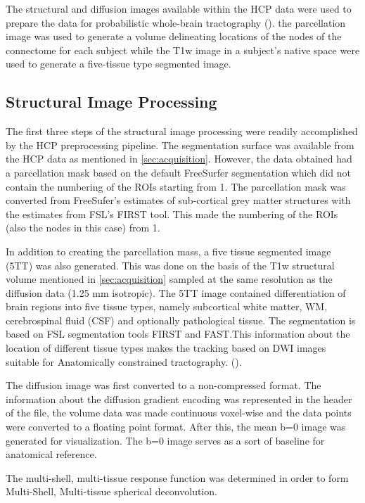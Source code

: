 \documentclass[msthesis.tex]{subfiles}
\begin{document}
The structural and diffusion images available within the HCP data were used to prepare the data for probabilistic whole-brain tractography (\cite{parker2003framework}). the parcellation image was used to generate a volume delineating locations of the nodes of the connectome for each subject while the T1w image in a subject's native space were used to generate a five-tissue type segmented image.

\subsection{Structural Image Processing}
\label{subsec:struct_diff}

The first three steps of the structural image processing were readily accomplished by the HCP preprocessing pipeline. The segmentation surface was available from the HCP data as mentioned in  \autoref{sec:acquisition}. However, the data obtained had a parcellation mask based on the default FreeSurfer segmentation which did not contain the numbering of the ROIs starting from 1. The parcellation mask was converted from FreeSufer's estimates of sub-cortical grey matter structures with the estimates from FSL's FIRST tool. This made the numbering of the ROIs (also the nodes in this case) from 1. 

In addition to creating the parcellation mass, a five tissue segmented image (5TT) was also generated. This was done on the basis of the T1w structural volume mentioned in \autoref{sec:acquisition} sampled at the same resolution as the diffusion data (1.25 mm isotropic). The 5TT image contained differentiation of brain regions into five tissue types, namely subcortical white matter, WM, cerebrospinal fluid (CSF) and optionally pathological tissue. The segmentation is based on FSL segmentation tools FIRST and FAST.This information about the location of different tissue types makes the tracking based on DWI images suitable for Anatomically constrained tractography.  (\cite{anattractsmith}). 


\iffalse
The diffusion image was first converted to a non-compressed format. The information about the diffusion gradient encoding was represented in the header of the file, the volume data was made continuous voxel-wise and the data points were converted to a floating point format. 
After this, the mean b=0 image was generated for visualization. The b=0 image serves as a sort of baseline for anatomical reference.

The multi-shell, multi-tissue response function was determined  in order to form Multi-Shell, Multi-tissue spherical deconvolution. 
\end{document}
